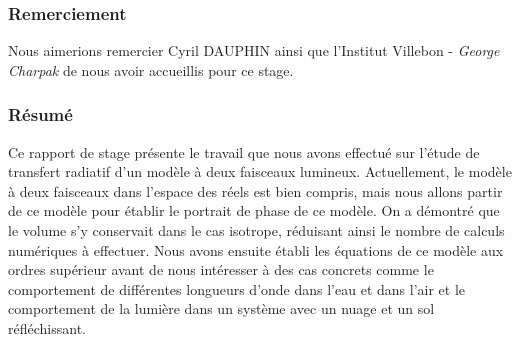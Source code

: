 \documentclass[12pt]{article}
\begin{document}
\newpage
\begin{adjustwidth}{30pt}{30pt}

\begin{center}
    \subsubsection*{Remerciement}

Nous aimerions remercier Cyril DAUPHIN ainsi que l’Institut Villebon - \textit{George Charpak} de nous avoir accueillis pour ce stage. 
\end{center}
\begin{center}
    \subsubsection*{Résumé}
\end{center}
Ce rapport de stage présente le travail que nous avons effectué sur l’étude de transfert radiatif d’un modèle à deux faisceaux lumineux.
Actuellement, le modèle à deux faisceaux dans l’espace des réels est bien compris, mais nous allons partir de ce modèle pour établir le portrait de phase de ce modèle. On a démontré que le volume s’y conservait dans le cas isotrope, réduisant ainsi le nombre de calculs numériques à effectuer. Nous avons ensuite établi les équations de ce modèle aux ordres supérieur avant de nous intéresser à des cas concrets comme le comportement de différentes longueurs d’onde dans l’eau et dans l’air et le comportement de la lumière dans un système avec un nuage et un sol réfléchissant.
\end{adjustwidth}

\vspace{50pt}
\tableofcontents
\newpage
\listoffigures
\newpage
\setlength{\parskip}{0.5 em}
\end{document}
